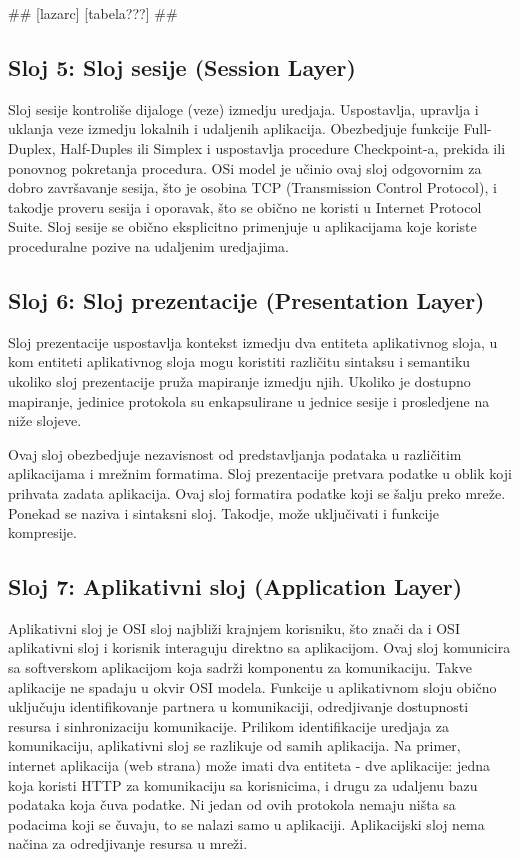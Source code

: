 \documentclass[a4paper,12pt, master]{etf}
\begin{document}
	\#\# [lazarc] [tabela???] \#\#

	\subsection{Sloj 5: Sloj sesije (Session Layer)}

	Sloj sesije kontroli\v{s}e dijaloge (veze) izmedju uredjaja. Uspostavlja, 
	upravlja i uklanja veze izmedju lokalnih i udaljenih aplikacija. 
	Obezbedjuje funkcije Full-Duplex, Half-Duples ili Simplex i uspostavlja 
	procedure Checkpoint-a, prekida ili ponovnog pokretanja procedura. OSi 
	model je u\v{c}inio ovaj sloj odgovornim za dobro zavr\v{s}avanje sesija,
	\v{s}to je osobina TCP (Transmission Control Protocol), i takodje proveru 
	sesija i oporavak, \v{s}to se obi\v{c}no ne koristi u Internet Protocol 
	Suite. Sloj sesije se obi\v{c}no eksplicitno primenjuje u aplikacijama koje 
	koriste proceduralne pozive na udaljenim uredjajima.

	\subsection{Sloj 6: Sloj prezentacije (Presentation Layer)}

	Sloj prezentacije uspostavlja kontekst izmedju dva entiteta aplikativnog 
	sloja, u kom entiteti aplikativnog sloja mogu koristiti razli\v{c}itu 
	sintaksu i semantiku ukoliko sloj prezentacije pru\v{z}a mapiranje izmedju 
	njih. Ukoliko je dostupno mapiranje, jedinice protokola su enkapsulirane u 
	jednice sesije i prosledjene na ni\v{z}e slojeve.

	Ovaj sloj obezbedjuje nezavisnost od predstavljanja podataka u 
	razli\v{c}itim aplikacijama i mre\v{z}nim formatima. Sloj prezentacije 
	pretvara podatke u oblik koji prihvata zadata aplikacija. Ovaj sloj  
	formatira podatke koji se \v{s}alju preko mre\v{z}e. Ponekad se naziva i
	sintaksni sloj.	Takodje, mo\v{z}e uklju\v{c}ivati i funkcije kompresije.

	\subsection{Sloj 7: Aplikativni sloj (Application Layer)}

	Aplikativni sloj je OSI sloj najbli\v{z}i krajnjem korisniku, \v{s}to 
	zna\v{c}i da i OSI aplikativni sloj i korisnik interaguju direktno sa 
	aplikacijom. Ovaj sloj komunicira sa softverskom aplikacijom koja 
	sadr\v{z}i komponentu za komunikaciju. Takve aplikacije ne spadaju u okvir
	OSI modela.	Funkcije u aplikativnom sloju obi\v{c}no uklju\v{c}uju 
	identifikovanje partnera u komunikaciji, odredjivanje dostupnosti resursa i 
	sinhronizaciju komunikacije. Prilikom identifikacije uredjaja za 
	komunikaciju, aplikativni sloj se razlikuje od samih aplikacija. Na primer, 
	internet aplikacija (web strana) mo\v{z}e imati dva entiteta - dve 	
	aplikacije: jedna koja koristi HTTP za komunikaciju sa korisnicima, i drugu 
	za udaljenu	bazu podataka koja \v{c}uva podatke. Ni jedan od ovih protokola 
	nemaju ni\v{s}ta sa podacima koji se \v{c}uvaju, to se nalazi samo u 
	aplikaciji. Aplikacijski sloj nema na\v{c}ina za odredjivanje resursa u 
	mre\v{z}i.
\end{document}
